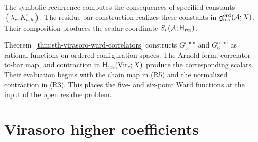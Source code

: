 \begin{remark}
\label{rem:sth-two-chains}
The symbolic recurrence computes the consequences of specified
constants \((\lambda_r,K^r_{a,b})\).  The residue-bar construction
realizes these constants in
\(\mathfrak g_{\mathrm{res}}^{\mathrm{ord}}(\mathcal A;X)\).  Their
composition produces the scalar coordinate
\(S_r(\mathcal A;\mathsf H_{\mathrm{res}})\).
\end{remark}

\begin{remark}
\label{rem:s5-bpz-wick-verification}
Theorem~\ref{thm:sth-virasoro-ward-correlators} constructs
\(G_5^{\mathrm{conn}}\) and \(G_6^{\mathrm{conn}}\) as rational
functions on ordered configuration spaces.  The Arnold form,
correlator-to-bar map, and contraction in
\(\mathsf H_{\mathrm{res}}(\mathrm{Vir}_c;X)\) produce the corresponding
scalars.  Their evaluation begins with the chain map in
\textup{(R5)} and the normalized contraction in
\textup{(R3)}.  This places the five- and six-point Ward functions
at the input of the open residue problem.
\end{remark}

\section{Virasoro higher coefficients}
\label{sec:sth-s6-s7-s8}
\label{sec:sth-s6}
\label{sec:sth-s7}
\label{sec:sth-s8}
\label{sec:sth-boundary}
\label{sec:sth-summary}
\label{sec:sth-main-thread-extensions}

